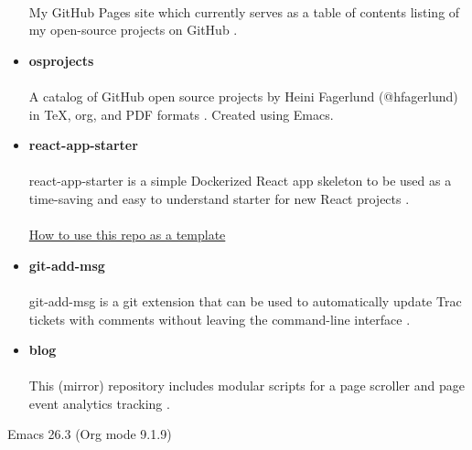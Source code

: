 \documentclass[11pt]{article}
\begin{document}
\begin{itemize}
\paragraph{}
My GitHub Pages site which currently serves as a table of contents listing of my open-source projects on GitHub \cite{ghpages}.
\item \textbf{osprojects}
\paragraph{}
A catalog of GitHub open source projects by Heini Fagerlund (@hfagerlund) in \TeX{}, org, and PDF formats \cite{osprojects}. Created using Emacs.
\item \textbf{react-app-starter}
\paragraph{}
react-app-starter is a simple Dockerized React app skeleton to be used as a time-saving and easy to understand starter for new React projects \cite{react-app-starter}.
\paragraph{}
\href{https://docs.github.com/en/github/creating-cloning-and-archiving-repositories/creating-a-repository-on-github/creating-a-repository-from-a-template}{How to use this repo as a template}
\item \textbf{git-add-msg}
\paragraph{}
git-add-msg is a git extension that can be used to automatically update Trac tickets with comments without leaving the command-line interface \cite{git-add-msg}.
\item \textbf{blog}
\paragraph{}
This (mirror) repository includes modular scripts for a page scroller and page event analytics tracking \cite{blog}.
\end{itemize}

\begin{LaTeX}
\begin{sloppypar}


\end{sloppypar}
\end{LaTeX}
Emacs 26.3 (Org mode 9.1.9)
\end{document}
